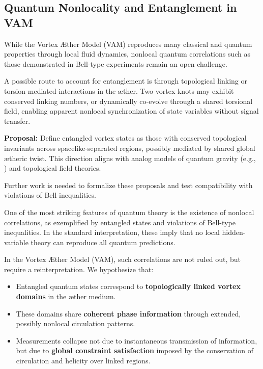 \subsection{Quantum Nonlocality and Entanglement in VAM}
\label{sec:entanglement}

While the Vortex Æther Model (VAM) reproduces many classical and quantum properties through local fluid dynamics, nonlocal quantum correlations such as those demonstrated in Bell-type experiments remain an open challenge.

A possible route to account for entanglement is through topological linking or torsion-mediated interactions in the æther. Two vortex knots may exhibit conserved linking numbers, or dynamically co-evolve through a shared torsional field, enabling apparent nonlocal synchronization of state variables without signal transfer.

\textbf{Proposal:} Define entangled vortex states as those with conserved topological invariants across spacelike-separated regions, possibly mediated by shared global ætheric twist. This direction aligns with analog models of quantum gravity (e.g., \cite{volovik2003universe}) and topological field theories.

Further work is needed to formalize these proposals and test compatibility with violations of Bell inequalities.

One of the most striking features of quantum theory is the existence of nonlocal correlations, as exemplified by entangled states and violations of Bell-type inequalities. In the standard interpretation, these imply that no local hidden-variable theory can reproduce all quantum predictions.

In the Vortex Æther Model (VAM), such correlations are not ruled out, but require a reinterpretation. We hypothesize that:

\begin{itemize}
    \item Entangled quantum states correspond to \textbf{topologically linked vortex domains} in the æther medium.
    \item These domains share \textbf{coherent phase information} through extended, possibly nonlocal circulation patterns.
    \item Measurements collapse not due to instantaneous transmission of information, but due to \textbf{global constraint satisfaction} imposed by the conservation of circulation and helicity over linked regions.
\end{itemize}


